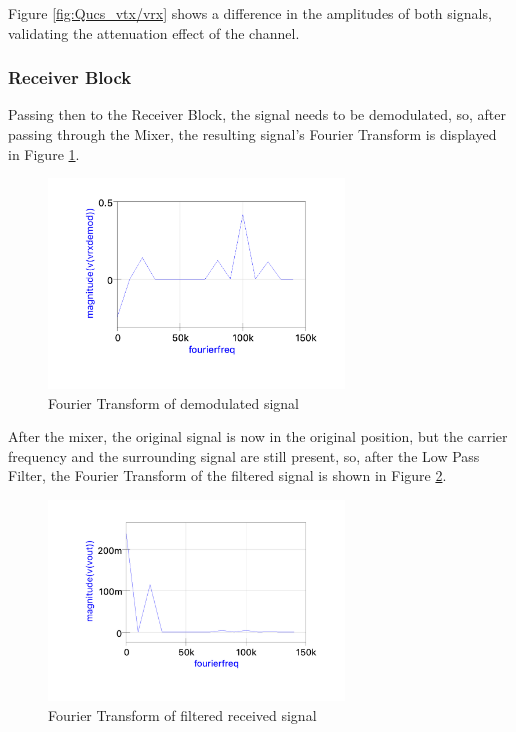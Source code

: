 Figure \ref{fig:Qucs_vtx/vrx} shows a difference in the amplitudes of both signals, validating the attenuation effect of the channel. 

\subsubsection{Receiver Block}

Passing then to the Receiver Block, the signal needs to be demodulated, so, after passing through the Mixer, the resulting signal's Fourier Transform is displayed in Figure \ref{fig:Qucs_vdemod}.

\begin{figure}[H]
    \centering
    \includegraphics*[width=0.7\textwidth]{Images/Qucs_vdemod.png}
    \caption{Fourier Transform of demodulated signal}
    \label{fig:Qucs_vdemod}
\end{figure}

After the mixer, the original signal is now in the original position, but the carrier frequency and the surrounding signal are still present, so, after the Low Pass Filter, the Fourier Transform of the filtered signal is shown in Figure \ref{fig:Qucs_vout}.

\begin{figure}[H]
    \centering
    \includegraphics*[width=0.7\textwidth]{Images/Qucs_vout.png}
    \caption{Fourier Transform of filtered received signal}
    \label{fig:Qucs_vout}
\end{figure}

